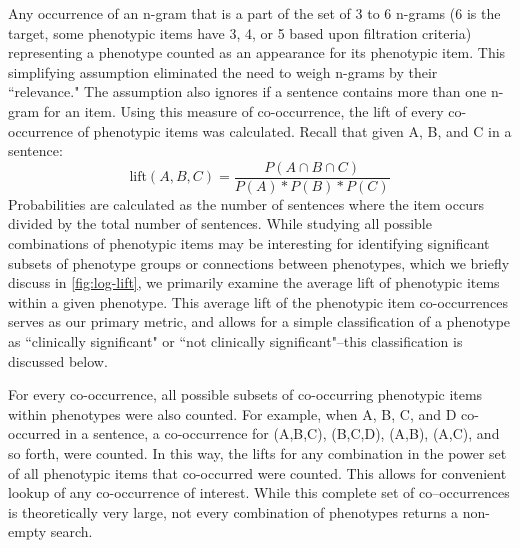 \documentclass{sig-alternate-05-2015}
\begin{document}
Any occurrence of an n-gram that is a part of the set of 3 to 6 n-grams (6 is the target, some phenotypic items have 3, 4, or 5 based upon filtration criteria) representing a phenotype counted as an appearance for its phenotypic item.
This simplifying assumption eliminated the need to weigh n-grams by their ``relevance."	
The assumption also ignores if a sentence contains more than one n-gram for an item.
Using this measure of co-occurrence, the lift of every co-occurrence of phenotypic items was calculated. Recall that given A, B, and C in a sentence:
$$ \text{lift}(A,B,C) = \frac {P(A \cap B \cap C)} {P(A)*P(B)*P(C)}  $$
Probabilities are calculated as the number of sentences where the item occurs divided by the total number of sentences.
While studying all possible combinations of phenotypic items may be interesting for identifying significant subsets of phenotype groups or connections between phenotypes, which we briefly discuss in \ref{fig:log-lift}, we primarily examine the average lift of phenotypic items within a given phenotype. This average lift of the phenotypic item co-occurrences serves as our primary metric, and allows for a simple classification of a phenotype as ``clinically significant" or ``not clinically significant"--this classification is discussed below.%

For every co-occurrence, all possible subsets of co-occurring phenotypic items within phenotypes were also counted.
For example, when A, B, C, and D co-occurred in a sentence, a co-occurrence for (A,B,C), (B,C,D), (A,B), (A,C), and so forth, were counted.
In this way, the lifts for any combination in the power set of all phenotypic items that co-occurred were counted.
This allows for convenient lookup of any co-occurrence of interest.
While this complete set of co--occurrences is theoretically very large, not every combination of phenotypes returns a non-empty search.
\end{document}
